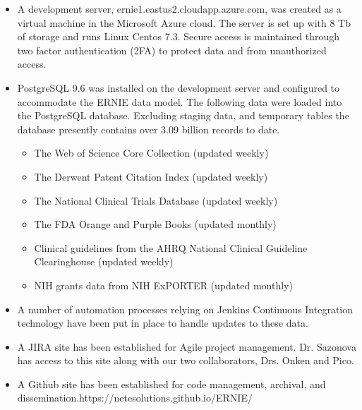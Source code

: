 \documentclass[11pt, oneside]{article}   	%
\begin{document}
\begin {itemize}
\item A development server, ernie1.eastus2.cloudapp.azure.com, was created as a virtual machine in the Microsoft Azure cloud. The server is set up with 8 Tb of storage and runs Linux Centos 7.3. Secure access is maintained through two factor authentication (2FA) to protect data and from unauthorized access.
\item PostgreSQL 9.6 was installed on the development server and configured to accommodate the ERNIE data model. The following data were loaded into the PostgreSQL database. Excluding staging data, and temporary tables the database presently contains over 3.09 billion records to date.

\begin {itemize}
\item The Web of Science Core Collection (updated weekly)
\item The Derwent Patent Citation Index  (updated weekly)
\item The National Clinical Trials Database  (updated weekly)
\item The FDA Orange and Purple Books  (updated monthly)
\item Clinical guidelines from the AHRQ National Clinical Guideline Clearinghouse (updated weekly)
\item NIH grants data from NIH ExPORTER (updated monthly)
\end {itemize}

\item A number of automation processes relying on Jenkins Continuous Integration technology have been put in place to handle updates to these data.
\item A JIRA site has been established for Agile project management. Dr. Sazonova has access to this site along with our two collaborators, Drs. Onken and Pico.
\item A Github site has been established for code management, archival, and dissemination.https://netesolutions.github.io/ERNIE/
\end {itemize}
\end{document}
